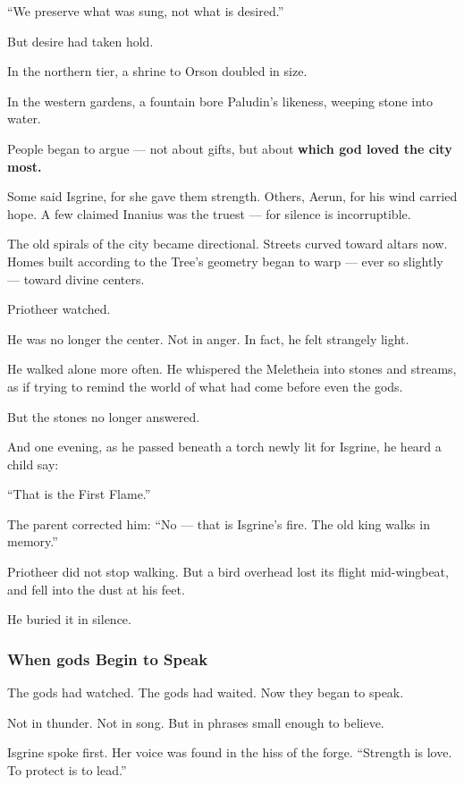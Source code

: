 \documentclass[12pt]{article}
\begin{document}
 “We preserve what was sung, not what is desired.”

But desire had taken hold.

In the northern tier, a shrine to Orson doubled in size.  

In the western gardens, a fountain bore Paludin’s likeness, weeping stone into water.

People began to argue — not about gifts,  
but about \textbf{which god loved the city most.}

Some said Isgrine, for she gave them strength.  
Others, Aerun, for his wind carried hope.  
A few claimed Inanius was the truest — for silence is incorruptible.

The old spirals of the city became directional.  
Streets curved toward altars now.  
Homes built according to the Tree’s geometry began to warp — ever so slightly — toward divine centers.

Priotheer watched.

He was no longer the center.  
Not in anger.  
In fact, he felt strangely light.

He walked alone more often.  
He whispered the Meletheia into stones and streams,  
as if trying to remind the world of what had come before even the gods.

But the stones no longer answered.

And one evening, as he passed beneath a torch newly lit for Isgrine,  
he heard a child say:

 “That is the First Flame.”

The parent corrected him:  
 “No — that is Isgrine’s fire. The old king walks in memory.”

Priotheer did not stop walking.  
But a bird overhead lost its flight mid-wingbeat,  
and fell into the dust at his feet.

He buried it in silence.

\dotfill

\subsubsection{When gods Begin to Speak}

The gods had watched.  
The gods had waited.  
Now they began to speak.

Not in thunder. Not in song.  
But in phrases small enough to believe.

Isgrine spoke first.  
Her voice was found in the hiss of the forge.  
 “Strength is love. To protect is to lead.”
\end{document}
